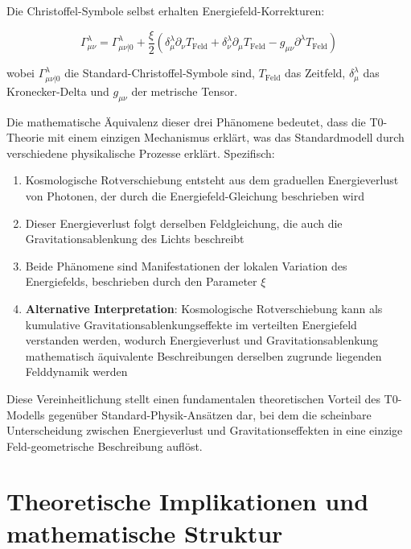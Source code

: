 \documentclass[12pt,a4paper]{article}
\newcommand{\tfield}{T_{\text{Feld}}}
\theoremstyle{definition}
\begin{document}
	Die Christoffel-Symbole selbst erhalten Energiefeld-Korrekturen:
	
	\begin{equation}
		\Gamma^\lambda_{\mu\nu} = \Gamma^\lambda_{\mu\nu|0} + \frac{\xi}{2} \left(\delta^\lambda_\mu \partial_\nu \tfield + \delta^\lambda_\nu \partial_\mu \tfield - g_{\mu\nu} \partial^\lambda \tfield\right)
	\end{equation}
	
	wobei $\Gamma^\lambda_{\mu\nu|0}$ die Standard-Christoffel-Symbole sind, $\tfield$ das Zeitfeld, $\delta^\lambda_\mu$ das Kronecker-Delta und $g_{\mu\nu}$ der metrische Tensor.
	
	\begin{important}
		Die mathematische \"Aquivalenz dieser drei Ph\"anomene bedeutet, dass die T0-Theorie mit einem einzigen Mechanismus erkl\"art, was das Standardmodell durch verschiedene physikalische Prozesse erkl\"art. Spezifisch:
		
		\begin{enumerate}
			\item Kosmologische Rotverschiebung entsteht aus dem graduellen Energieverlust von Photonen, der durch die Energiefeld-Gleichung beschrieben wird
			\item Dieser Energieverlust folgt derselben Feldgleichung, die auch die Gravitationsablenkung des Lichts beschreibt
			\item Beide Ph\"anomene sind Manifestationen der lokalen Variation des Energiefelds, beschrieben durch den Parameter $\xi$
			\item \textbf{Alternative Interpretation}: Kosmologische Rotverschiebung kann als kumulative Gravitationsablenkungseffekte im verteilten Energiefeld verstanden werden, wodurch Energieverlust und Gravitationsablenkung mathematisch \"aquivalente Beschreibungen derselben zugrunde liegenden Felddynamik werden
		\end{enumerate}
		
		Diese Vereinheitlichung stellt einen fundamentalen theoretischen Vorteil des T0-Modells gegen\"uber Standard-Physik-Ans\"atzen dar, bei dem die scheinbare Unterscheidung zwischen Energieverlust und Gravitationseffekten in eine einzige Feld-geometrische Beschreibung aufl\"ost.
	\end{important}
	
	\section{Theoretische Implikationen und mathematische Struktur}
	
\end{document}
